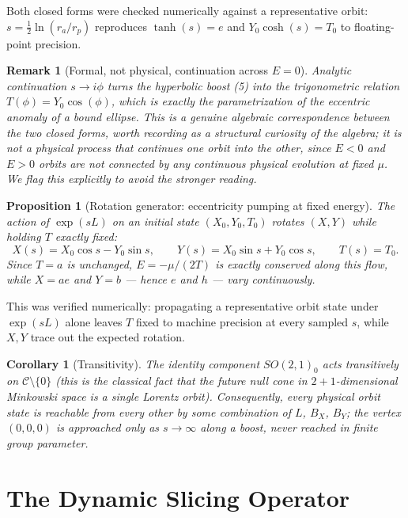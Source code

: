\documentclass[11pt]{amsart}
\newtheorem{proposition}[theorem]{Proposition}
\newtheorem{corollary}[theorem]{Corollary}
\newtheorem*{remark}{Remark}
\begin{document}
Both closed forms were checked numerically against a representative orbit: $s=\tfrac12\ln(r_a/r_p)$ reproduces $\tanh(s)=e$ and $Y_0\cosh(s)=T_0$ to floating-point precision.

\begin{remark}[Formal, not physical, continuation across $E=0$]
Analytic continuation $s\to i\phi$ turns the hyperbolic boost (5) into the trigonometric relation $T(\phi)=Y_0\cos(\phi)$, which is exactly the parametrization of the eccentric anomaly of a bound ellipse. This is a genuine algebraic correspondence between the two closed forms, worth recording as a structural curiosity of the algebra; it is \emph{not} a physical process that continues one orbit into the other, since $E<0$ and $E>0$ orbits are not connected by any continuous physical evolution at fixed $\mu$. We flag this explicitly to avoid the stronger reading.
\end{remark}

\begin{proposition}[Rotation generator: eccentricity pumping at fixed energy]\label{prop:rotation}
The action of $\exp(sL)$ on an initial state $(X_0,Y_0,T_0)$ rotates $(X,Y)$ while holding $T$ exactly fixed:
\[
X(s)=X_0\cos s-Y_0\sin s,\qquad Y(s)=X_0\sin s+Y_0\cos s,\qquad T(s)=T_0.
\]
Since $T=a$ is unchanged, $E=-\mu/(2T)$ is exactly conserved along this flow, while $X=ae$ and $Y=b$ --- hence $e$ and $h$ --- vary continuously.
\end{proposition}

This was verified numerically: propagating a representative orbit state under $\exp(sL)$ alone leaves $T$ fixed to machine precision at every sampled $s$, while $X,Y$ trace out the expected rotation.

\begin{corollary}[Transitivity]
The identity component $SO(2,1)_0$ acts transitively on $\mathcal C\setminus\{0\}$ (this is the classical fact that the future null cone in $2{+}1$-dimensional Minkowski space is a single Lorentz orbit). Consequently, every physical orbit state is reachable from every other by \emph{some} combination of $L$, $B_X$, $B_Y$; the vertex $(0,0,0)$ is approached only as $s\to\infty$ along a boost, never reached in finite group parameter.
\end{corollary}

\section{The Dynamic Slicing Operator}
\end{document}
